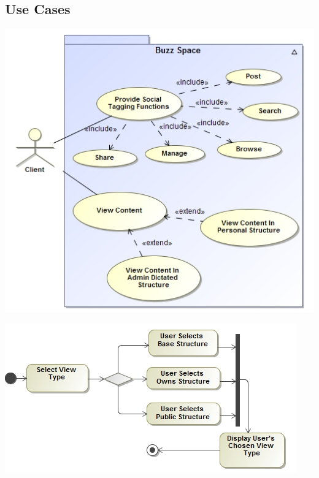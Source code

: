 \documentclass[12pt, oneside]{article}
\begin{document}
\subsection{Use Cases}
\includegraphics{socialTagging.jpg}
	\rule{0\linewidth}{0.15\linewidth}\par
\includegraphics{socialTaggingActivity.jpg}
	\rule{0\linewidth}{0.15\linewidth}\par
\end{document}
